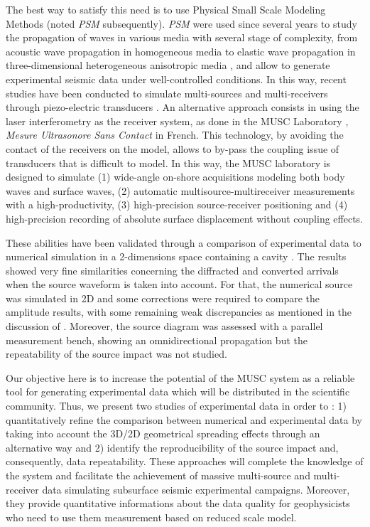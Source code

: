 \documentclass[manuscript,revised]{geophysics}
\newcommand{\psm}{\textit{PSM} }
\newcommand{\thrd}{three-dimensional }
\begin{document}
\noindent The best way to satisfy this need is to use Physical Small Scale Modeling Methods (noted \psm subsequently). \psm were used since several years to study the propagation of waves in various media with several stage of complexity, from acoustic wave propagation in homogeneous media to elastic wave propagation in \thrd heterogeneous anisotropic media \citep{Rieber_EWP_1936,Howes_SMS_1953,Hilterman_TDM_1970,French_MRP_1974,Bishop_LVM_1985,Pratt_FWI_1999,Favretto_NMT_2013,Sarkar_TPM_2003,Isaac_SMS_1999}, and allow to generate experimental seismic data under well-controlled conditions. In this way, recent studies have been conducted to simulate multi-sources and multi-receivers through piezo-electric transducers \citep{Wong_SPM_2009}. An alternative approach consists in using the laser interferometry as the receiver system, as done in the MUSC Laboratory \citep{Bretaudeau_SSA_2008b,Bretaudeau_SSM_2011,Bretaudeau_FWI_2013}, \textit{Mesure Ultrasonore Sans Contact} in French. This technology, by avoiding the contact of the receivers on the model, allows to by-pass the coupling issue of transducers that is difficult to model. In this way, the MUSC laboratory is designed to simulate (1) wide-angle on-shore acquisitions modeling both body waves and surface waves, (2) automatic multisource-multireceiver measurements with a high-productivity, (3) high-precision source-receiver positioning and (4) high-precision recording of absolute surface displacement without coupling effects. 

\noindent These abilities have been validated through a comparison of experimental data to numerical simulation in a 2-dimensions space containing a cavity \citep{Bretaudeau_SSM_2011}. The results showed very fine similarities concerning the diffracted and converted arrivals when the source waveform is taken into account. For that, the numerical source was simulated in 2D and some corrections were required to compare the amplitude results, with some remaining weak discrepancies as mentioned in the discussion of \citep{Bretaudeau_SSM_2011}. Moreover, the source diagram was assessed with a parallel measurement bench, showing an omnidirectional propagation but the repeatability of the source impact was not studied.

\noindent Our objective here is to increase the potential of the MUSC system as a reliable tool for generating experimental data which will be distributed in the scientific community. 
\noindent Thus, we present two studies of experimental data in order to : 1) quantitatively refine the comparison between numerical and experimental data by taking into account the 3D/2D geometrical spreading effects through an alternative way and 2) identify the reproducibility of the source impact and, consequently, data repeatability. These approaches will complete the knowledge of the system and facilitate the achievement of massive multi-source and multi-receiver data simulating subsurface seismic experimental campaigns. Moreover, they provide quantitative informations about the data quality for geophysicists who need to use them measurement based on reduced scale model. 
\end{document}
